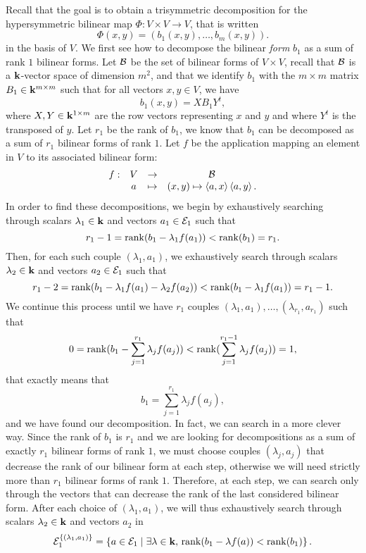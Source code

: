 Recall that the goal is to obtain a trisymmetric decomposition for the
hypersymmetric bilinear map $\Phi:V\times V\to V$, that is written
\[
  \Phi(x, y) = (b_1(x, y), \dots, b_m(x, y)).
\]
in the basis of $V$. We first see how to decompose the bilinear \emph{form}
$b_1$ as a sum of rank $1$ bilinear forms. Let $\mathcal{B}$ be the set of bilinear forms
of $V\times V$, recall that $\mathcal{B}$ is a $\mathbf{k}$-vector space of dimension $m^2$, and
that we identify $b_1$ with the $m\times m$ matrix $B_1\in\mathbf{k}^{m\times m}$ 
such that for all vectors $x, y\in V$, we have
\[
  b_1(x, y) = X B_1 Y^t,
\]
where $X, Y\in\mathbf{k}^{1\times m}$ are the row vectors representing $x$ and $y$ and
where $Y^t$ is the transposed of $y$. Let $r_1$ be the rank of $b_1$, we know
that $b_1$ can be decomposed as a sum of $r_1$ bilinear forms of rank $1$. Let
$f$ be the application mapping an element in $V$ to its associated bilinear
form:
\[
  \begin{array}{cccc}
    f: & V & \to & \mathcal{B}\\
    & a & \mapsto & (x, y)\mapsto\left\langle a,x\right\rangle\left\langle a,y\right\rangle.
  \end{array}
\]
In order to find these decompositions, we begin by exhaustively searching through scalars $\lambda_1\in\mathbf{k}$ and vectors
$a_1\in \mathcal{E}_1$ such that
\[
  r_1-1=\operatorname{rank}(b_1-\lambda_1 f(a_1)) < \operatorname{rank}(b_1)=r_1.
\]
Then, for each such couple $(\lambda_1, a_1)$, we exhaustively search through
scalars $\lambda_2\in\mathbf{k}$ and vectors $a_2\in \mathcal{E}_1$ such that
\[
  r_1-2=\operatorname{rank}(b_1-\lambda_1 f(a_1)-\lambda_2f(a_2)) < \operatorname{rank}(b_1-\lambda_1
  f(a_1))=r_1-1.
\]
We continue this process until we have $r_1$ couples $(\lambda_1, a_1), \dots,
(\lambda_{r_1}, a_{r_1})$ such that
\[
  0 = \operatorname{rank}(b_1-\sum_{j=1}^{r_1}\lambda_jf(a_j)) <
  \operatorname{rank}(\sum_{j=1}^{r_1-1}\lambda_jf(a_j)) = 1,
\]
that exactly means that
\[
  b_1 = \sum_{j=1}^{r_1}\lambda_jf(a_j),
\]
and we have found our decomposition.
In fact, we can search in a more clever way. Since the rank of $b_1$ is $r_1$
and we are looking for decompositions as a sum of exactly $r_1$ bilinear forms of
rank $1$, we must choose
couples $(\lambda_j, a_j)$ that decrease the rank of our bilinear form at each
step, otherwise we will need strictly more than $r_1$ bilinear forms of rank
$1$. Therefore, at each step, we can search only through the vectors that can
decrease the rank of the last considered bilinear form. After each choice of
$(\lambda_1, a_1)$, we will thus exhaustively search through scalars
$\lambda_2\in\mathbf{k}$ and vectors $a_2$ in
\[
  \mathcal{E}_1^{\left\{ (\lambda_1, a_1) \right\}} = \left\{
  a\in\mathcal{E}_1\;|\;\exists\lambda\in\mathbf{k},\,\operatorname{rank}(b_1-\lambda f(a)) <\operatorname{rank}(b_1)
\right\}.
\]
